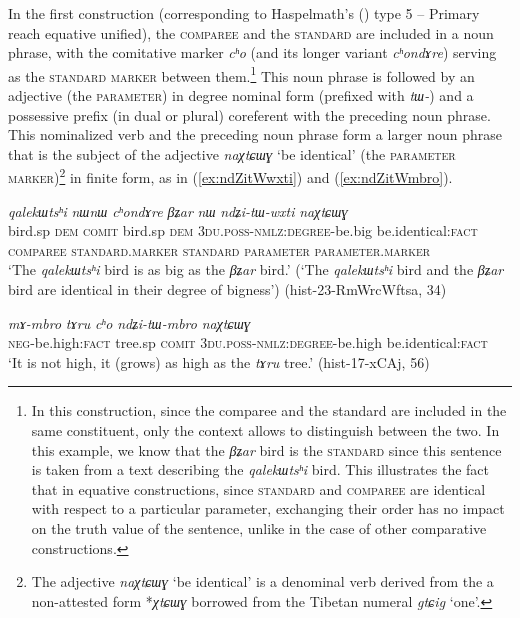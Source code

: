 \documentclass[oneside,a4paper,12pt]{article}
\newcommand{\ipa}[1]{{\phon\textit{#1}}}
\newcommand{\forme}[2]{\ipa{#1} `#2'}
\begin{document}
In the first construction (corresponding to Haspelmath's (\citeyear{haspelmath17equative}) type 5 -- Primary reach equative unified), the \textsc{comparee} and the \textsc{standard} are included in a noun phrase, with the comitative marker \ipa{cʰo} (and its longer variant \ipa{cʰondɤre}) serving as the \textsc{standard marker} between them.\footnote{In this construction, since the comparee and the standard are included in the same constituent, only the context allows to distinguish between the two. In this example, we know that the \ipa{βʑar} bird is the \textsc{standard} since this sentence is taken from a text describing the \ipa{qalekɯtsʰi} bird. This illustrates the fact that in equative constructions, since \textsc{standard} and \textsc{comparee} are identical with respect to a particular parameter, exchanging their order has no impact on the truth value of the sentence, unlike in the case of other comparative constructions.} This noun phrase is followed by an adjective (the \textsc{parameter}) in degree nominal form (prefixed with \ipa{tɯ-}) and a possessive prefix (in dual or plural) coreferent with the preceding noun phrase. This nominalized verb and the preceding noun phrase form a larger noun phrase that is the subject of the adjective \forme{naχtɕɯɣ}{be identical} (the \textsc{parameter marker})\footnote{The adjective \forme{naχtɕɯɣ}{be identical} is a denominal verb derived from the a non-attested form *\ipa{χtɕɯɣ} borrowed from the Tibetan numeral \forme{gtɕig}{one}. } in finite form, as in (\ref{ex:ndZitWwxti}) and (\ref{ex:ndZitWmbro}).

\begin{exe}
\ex \label{ex:ndZitWwxti}
\glll
\ipa{qalekɯtsʰi} 	\ipa{nɯnɯ} 	\ipa{cʰondɤre} 	\ipa{βʑar} 	\ipa{nɯ} 	\ipa{ndʑi-tɯ-wxti} 	\ipa{naχtɕɯɣ} \\
bird.sp \textsc{dem} \textsc{comit} bird.sp \textsc{dem} \textsc{3du.poss-nmlz:degree}-be.big be.identical:\textsc{fact} \\
{\textsc{comparee}} { } \textsc{standard.marker} {\textsc{standard}} { } \textsc{parameter} \textsc{parameter.marker} \\
\glt `The \ipa{qalekɯtsʰi} bird is as big as the \ipa{βʑar} bird.' (`The \ipa{qalekɯtsʰi} bird and the \ipa{βʑar} bird are identical in their degree of bigness')  (hist-23-RmWrcWftsa, 34)
\end{exe}
 

\begin{exe}
\ex \label{ex:ndZitWmbro}
\gll 
\ipa{mɤ-mbro} 	\ipa{tɤru} 	\ipa{cʰo} 	\ipa{ndʑi-tɯ-mbro} 	\ipa{naχtɕɯɣ} \\
\textsc{neg}-be.high:\textsc{fact} tree.sp \textsc{comit} \textsc{3du.poss-nmlz:degree}-be.high be.identical:\textsc{fact} \\
\glt `It is not high, it (grows) as high as the \ipa{tɤru} tree.' (hist-17-xCAj, 56)
\end{exe}
\end{document}
